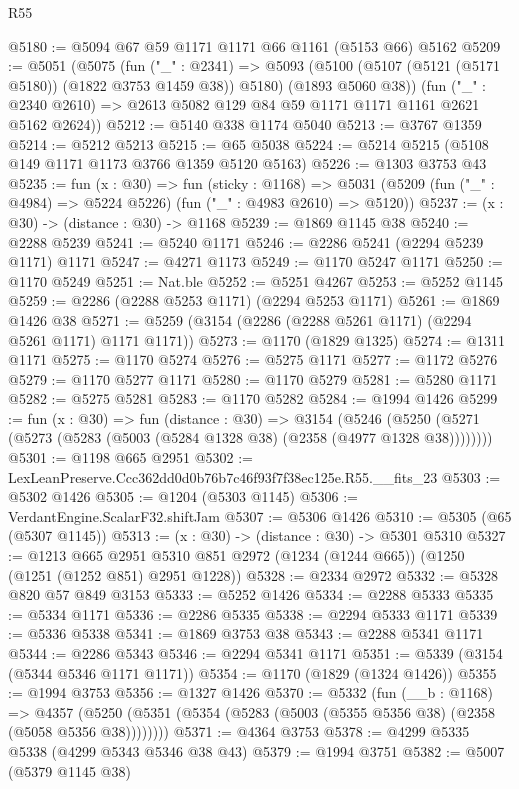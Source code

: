 \begin{lexlean}{R55}
\begin{coremodule}
@5180 := @5094 @67 @59 @1171 @1171 @66 @1161 (@5153 @66) @5162
@5209 := @5051
    (@5075
      (fun ("_" : @2341) =>
      @5093 (@5100 (@5107 (@5121 (@5171 @5180)) (@1822 @3753 @1459 @38)) @5180) (@1893 @5060 @38))
      (fun ("_" : @2340 @2610) => @2613 @5082 @129 @84 @59 @1171 @1171 @1161 @2621 @5162 @2624))
@5212 := @5140 @338 @1174 @5040
@5213 := @3767 @1359
@5214 := @5212 @5213
@5215 := @65 @5038
@5224 := @5214 @5215 (@5108 @149 @1171 @1173 @3766 @1359 @5120 @5163)
@5226 := @1303 @3753 @43
@5235 := fun (x : @30) =>
  fun (sticky : @1168) =>
  @5031 (@5209 (fun ("_" : @4984) => @5224 @5226) (fun ("_" : @4983 @2610) => @5120))
@5237 := (x : @30) -> (distance : @30) -> @1168
@5239 := @1869 @1145 @38
@5240 := @2288 @5239
@5241 := @5240 @1171
@5246 := @2286 @5241 (@2294 @5239 @1171) @1171
@5247 := @4271 @1173
@5249 := @1170 @5247 @1171
@5250 := @1170 @5249
@5251 := Nat.ble
@5252 := @5251 @4267
@5253 := @5252 @1145
@5259 := @2286 (@2288 @5253 @1171) (@2294 @5253 @1171)
@5261 := @1869 @1426 @38
@5271 := @5259 (@3154 (@2286 (@2288 @5261 @1171) (@2294 @5261 @1171) @1171 @1171))
@5273 := @1170 (@1829 @1325)
@5274 := @1311 @1171
@5275 := @1170 @5274
@5276 := @5275 @1171
@5277 := @1172 @5276
@5279 := @1170 @5277 @1171
@5280 := @1170 @5279
@5281 := @5280 @1171
@5282 := @5275 @5281
@5283 := @1170 @5282
@5284 := @1994 @1426
@5299 := fun (x : @30) =>
  fun (distance : @30) =>
  @3154 (@5246 (@5250 (@5271 (@5273 (@5283 (@5003 (@5284 @1328 @38) (@2358 (@4977 @1328 @38))))))))
@5301 := @1198 @665 @2951
@5302 := LexLeanPreserve.Ccc362dd0d0b76b7c46f93f7f38ec125e.R55.__fits_23
@5303 := @5302 @1426
@5305 := @1204 (@5303 @1145)
@5306 := VerdantEngine.ScalarF32.shiftJam
@5307 := @5306 @1426
@5310 := @5305 (@65 (@5307 @1145))
@5313 := (x : @30) -> (distance : @30) -> @5301 @5310
@5327 := @1213
    @665
    @2951
    @5310
    @851
    @2972
    (@1234 (@1244 @665))
    (@1250 (@1251 (@1252 @851) @2951 @1228))
@5328 := @2334 @2972
@5332 := @5328 @820 @57 @849 @3153
@5333 := @5252 @1426
@5334 := @2288 @5333
@5335 := @5334 @1171
@5336 := @2286 @5335
@5338 := @2294 @5333 @1171
@5339 := @5336 @5338
@5341 := @1869 @3753 @38
@5343 := @2288 @5341 @1171
@5344 := @2286 @5343
@5346 := @2294 @5341 @1171
@5351 := @5339 (@3154 (@5344 @5346 @1171 @1171))
@5354 := @1170 (@1829 (@1324 @1426))
@5355 := @1994 @3753
@5356 := @1327 @1426
@5370 := @5332
    (fun (__b : @1168) =>
    @4357 (@5250 (@5351 (@5354 (@5283 (@5003 (@5355 @5356 @38) (@2358 (@5058 @5356 @38))))))))
@5371 := @4364 @3753
@5378 := @4299 @5335 @5338 (@4299 @5343 @5346 @38 @43)
@5379 := @1994 @3751
@5382 := @5007 (@5379 @1145 @38)

\end{coremodule}
\end{lexlean}
